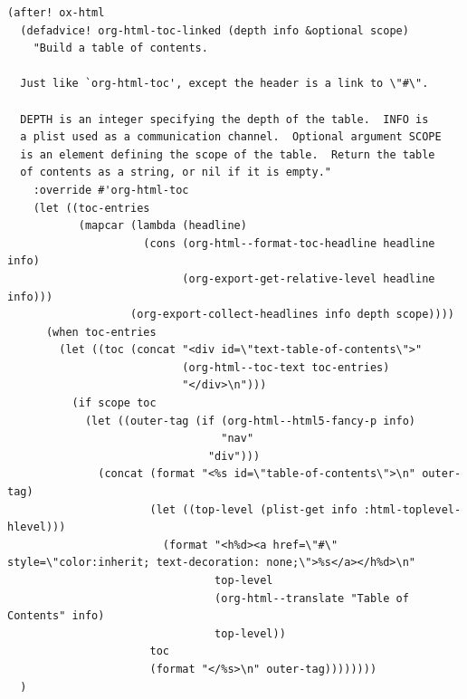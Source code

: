 \documentclass[11pt]{article}
\begin{document}
\begin{verbatim}
(after! ox-html
  (defadvice! org-html-toc-linked (depth info &optional scope)
    "Build a table of contents.

  Just like `org-html-toc', except the header is a link to \"#\".

  DEPTH is an integer specifying the depth of the table.  INFO is
  a plist used as a communication channel.  Optional argument SCOPE
  is an element defining the scope of the table.  Return the table
  of contents as a string, or nil if it is empty."
    :override #'org-html-toc
    (let ((toc-entries
           (mapcar (lambda (headline)
                     (cons (org-html--format-toc-headline headline info)
                           (org-export-get-relative-level headline info)))
                   (org-export-collect-headlines info depth scope))))
      (when toc-entries
        (let ((toc (concat "<div id=\"text-table-of-contents\">"
                           (org-html--toc-text toc-entries)
                           "</div>\n")))
          (if scope toc
            (let ((outer-tag (if (org-html--html5-fancy-p info)
                                 "nav"
                               "div")))
              (concat (format "<%s id=\"table-of-contents\">\n" outer-tag)
                      (let ((top-level (plist-get info :html-toplevel-hlevel)))
                        (format "<h%d><a href=\"#\" style=\"color:inherit; text-decoration: none;\">%s</a></h%d>\n"
                                top-level
                                (org-html--translate "Table of Contents" info)
                                top-level))
                      toc
                      (format "</%s>\n" outer-tag))))))))
  )
\end{verbatim}
\end{document}

